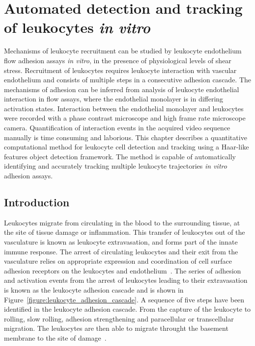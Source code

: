 \chapter{Automated detection and tracking of leukocytes \emph{in vitro}}
\label{chapter:leukocytes}
\ifpdf
    \graphicspath{{chapter_4/figs/}}
\fi


Mechanisms of leukocyte recruitment can be studied by leukocyte endothelium flow adhesion assays \emph{in vitro}, in the presence of physiological levels of shear stress. Recruitment of leukocytes requires leukocyte interaction with vascular endothelium and consists of multiple steps in a consecutive adhesion cascade. The mechanisms of adhesion can be inferred from analysis of leukocyte endothelial interaction in flow assays, where the endothelial monolayer is in differing activation states. Interaction between the endothelial monolayer and leukocytes were recorded with a phase contrast microscope and high frame rate microscope camera. Quantification of interaction events in the acquired video sequence manually is time consuming and laborious. This chapter describes a quantitative computational method for leukocyte cell detection and tracking using a Haar-like features object detection framework. The method is capable of automatically identifying and accurately tracking multiple leukocyte trajectories \emph{in vitro} adhesion assays.

\section{Introduction}
\label{leukocytes:introduction}
Leukocytes migrate from circulating in the blood to the surrounding tissue, at the site of tissue damage or inflammation. This transfer of leukocytes out of the vasculature is known as leukocyte extravasation, and forms part of the innate immune response. The arrest of circulating leukocytes and their exit from the vasculature relies on appropriate expression and coordination of cell surface adhesion receptors on the leukocytes and endothelium~\cite{Mayadas1993}. The series of adhesion and activation events from the arrest of leukocytes leading to their extravasation is known as the leukocyte adhesion cascade and is shown in Figure~\ref{figure:leukocyte_adhesion_cascade}. A sequence of five steps have been identified in the leukocyte adhesion cascade. From the capture of the leukocyte to rolling, slow rolling, adhesion strengthening and paracellular or transcellular migration. The leukocytes are then able to migrate throught the basement membrane to the site of damage~\cite{Ley2007}.

